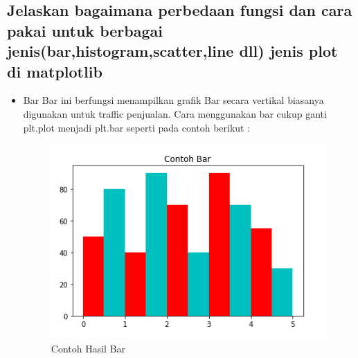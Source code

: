 \subsection{Jelaskan bagaimana perbedaan fungsi dan cara pakai untuk berbagai jenis(bar,histogram,scatter,line dll) jenis plot di matplotlib}
\begin{itemize}
	\item Bar\newline
	Bar ini berfungsi menampilkan grafik Bar secara vertikal biasanya digunakan untuk traffic penjualan.\newline
	Cara menggunakan bar cukup ganti plt.plot menjadi plt.bar seperti pada contoh berikut :

	

\begin{figure}[h]
\centering
\includegraphics[scale=0.3]{figures/6/Teori/1174002/no3bar.png}
\caption{Contoh Hasil Bar}
\label{fig:contoh}
\end{figure}
\end{itemize}

